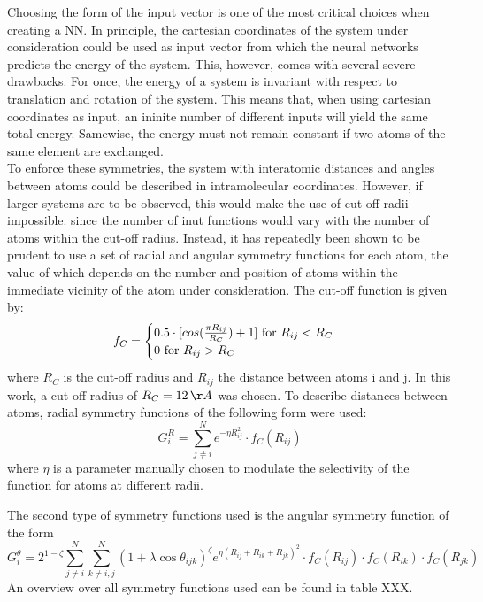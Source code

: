 \documentclass[12pt,titlepage]{article}
\begin{document}
Choosing the form of the input vector is one of the most critical choices when creating a NN. In principle, the cartesian coordinates of the system under consideration could be used as input vector from which the neural networks predicts the energy of the system. This, however, comes with several severe drawbacks. For once, the energy of a system is invariant with respect to translation and rotation of the system. This means that, when using cartesian coordinates as input, an ininite number of different inputs will yield the same total energy.
Samewise, the energy must not remain constant if two atoms of the same element are exchanged.\\
To enforce these symmetries, the system with interatomic distances and angles between atoms could be described in intramolecular coordinates. However, if larger systems are to be observed, this would make the use of cut-off radii impossible. since the number of inut functions would vary with the number of atoms within the cut-off radius.
Instead, it has repeatedly been shown to be prudent to use a set of radial and angular symmetry functions for each atom, the value of which depends on the number and position of atoms within the immediate vicinity of the atom under consideration.
The cut-off function is given by:
\begin{equation}
f_C = 
\begin{cases}
0.5 \cdot [cos({\pi R_{ij} \over R_C}) +1] \text{ for $R_{ij} < R_C$}\\
0 \text{ for $R_{ij} > R_C$}
\end{cases}
\end{equation}
where $R_C$ is the cut-off radius and $R_{ij}$ the distance between atoms i and j. In this work, a cut-off radius of $R_C = 12\,\AA$ was chosen.
To describe distances between atoms, radial symmetry functions of the following form were used:
\begin{equation}
G_i^R=\sum_{j \neq i}^{N}e^{-\eta R^2_{ij}} \cdot f_C(R_{ij})
\end{equation} 
where $\eta$ is a parameter manually chosen to modulate the selectivity of the function for atoms at different radii.

The second type of symmetry functions used is the angular symmetry function of the form
\begin{equation}
G_i^\theta = 2^{1-\zeta} \sum_{j \neq i}^N \sum_{k \neq i, j}^{N} (1+\lambda \cos{ \theta_{ijk}})^\zeta e^{\eta (R_{ij}+R_{ik}+R_{jk})^2}\cdot f_C(R_{ij}) \cdot f_C(R_{ik}) \cdot f_C(R_{jk})
\end{equation} 
An overview over all symmetry functions used can be found in table XXX.
\end{document}

